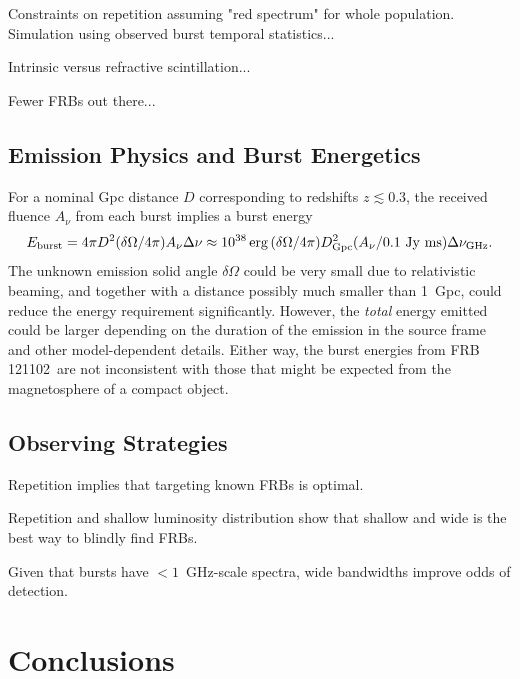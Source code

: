 \documentclass[twocolumn]{aastex61}
\newcommand{\frb}{FRB 121102}
\begin{document}
Constraints on repetition assuming "red spectrum" for whole population. Simulation using observed burst temporal statistics...

Intrinsic versus refractive scintillation...

Fewer FRBs out there...

\subsection{Emission Physics and Burst Energetics}

For a nominal Gpc distance $D$ corresponding to redshifts $z\lesssim 0.3$, the received fluence $A_{\nu}$ from each burst implies  a burst energy
$$E_{\rm burst} = 4\pi D^2 (\delta\Omega/4\pi) A_{\nu} \Delta\nu
\approx 10^{38}\, {\rm erg}\,(\delta\Omega/4\pi) D_{\rm Gpc}^2  (A_{\nu} / 0.1\ {\rm Jy\ ms}) \Delta\nu_{\rm GHz}.$$
The unknown  emission solid angle $\delta\Omega$
could be very small due to relativistic beaming, and together with a distance possibly much smaller than 1~Gpc, could reduce the energy requirement significantly.  However, the {\it total} energy emitted could be larger depending on the duration of the emission in the source frame and other model-dependent details.
Either way, the burst energies from \frb\ are not inconsistent with those that might be expected from the magnetosphere of a compact object\cite{2016MNRAS.457..232C}.



\subsection{Observing Strategies}

Repetition implies that targeting known FRBs is optimal.

Repetition and shallow luminosity distribution show that shallow and wide is the best way to blindly find FRBs.

Given that bursts have $<1$~GHz-scale spectra, wide bandwidths improve odds of detection.

\section{Conclusions}



\end{document}
